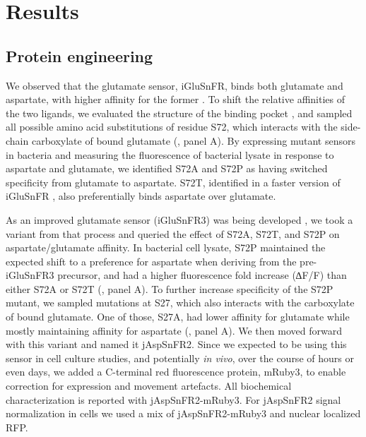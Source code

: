 \documentclass[9pt,lineno]{elife}
\begin{document}
\section{Results}

\subsection{Protein engineering}
We observed that the glutamate sensor, iGluSnFR, binds both glutamate and aspartate, with higher affinity for the former \citep{Marvin2013-qq}.
To shift the relative affinities of the two ligands, we evaluated the structure of the binding pocket  \citep{Hu2008-nd}, and sampled all possible amino acid substitutions of residue S72, which interacts with the side-chain carboxylate of bound glutamate (, panel A).
By expressing mutant sensors in bacteria and measuring the fluorescence of bacterial lysate in response to aspartate and glutamate, we identified S72A and S72P as having switched specificity from glutamate to aspartate.
S72T, identified in a faster version of iGluSnFR \citep{Helassa2018-fb}, also preferentially binds aspartate over glutamate.

As an improved glutamate sensor (iGluSnFR3) was being developed \citep{Aggarwal2023-pi}, we took a variant from that process and queried the effect of S72A, S72T, and S72P on aspartate/glutamate affinity.
In bacterial cell lysate, S72P maintained the expected shift to a preference for aspartate when deriving from the pre-iGluSnFR3 precursor, and had a higher fluorescence fold increase (∆F/F) than either S72A or S72T (, panel A).
To further increase specificity of the S72P mutant, we sampled mutations at S27, which also interacts with the carboxylate of bound glutamate.
One of those, S27A, had lower affinity for glutamate while mostly maintaining affinity for aspartate (, panel A).
We then moved forward with this variant and named it jAspSnFR2.
Since we expected to be using this sensor in cell culture studies, and potentially \textit{in vivo}, over the course of hours or even days, we added a C-terminal red fluorescence protein, mRuby3, to enable correction for expression and movement artefacts.
All biochemical characterization is reported with jAspSnFR2-mRuby3.
For jAspSnFR2 signal normalization in cells we used a mix of jAspSnFR2-mRuby3 and nuclear localized RFP.
\end{document}
